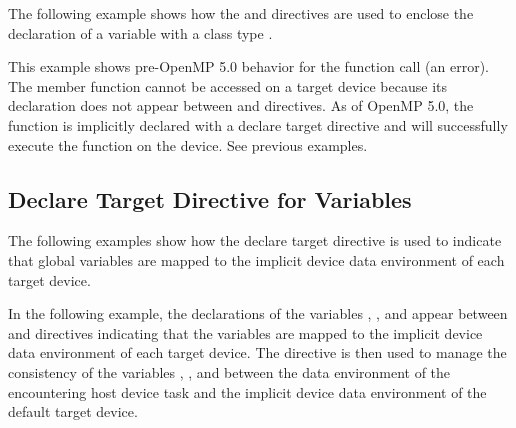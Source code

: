 \begin{cppspecific}

The following example shows how the  and  directives are used to enclose the declaration 
of a variable  with a class type . 

This example shows pre-OpenMP 5.0 behavior for the  function call (an error).
The member function  cannot be accessed on a target device because its 
declaration does not appear between  and 
 directives. As of OpenMP 5.0, the
function is implicitly declared with a declare target directive 
and will successfully execute the function on the device.  See previous examples.

\end{cppspecific}

\subsection{Declare Target Directive for Variables}
\label{subsec:declare_target_variables}



The following examples show how the declare target directive is used to indicate that
global variables are mapped to the implicit device data environment of each target device.

In the following example, the declarations of the variables , , and  appear 
between  and  
directives indicating that the variables are mapped to the implicit device data 
environment of each target device. The  directive 
is then used to manage the consistency of the variables , , and  between the 
data environment of the encountering host device task and the implicit device data 
environment of the default target device.

